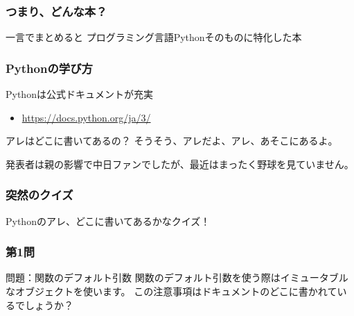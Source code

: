 \documentclass[aspectratio=169,dvipdfmx,12pt,notheorems]{beamer}
\theoremstyle{definition}
\begin{document}
\begin{frame}\frametitle{つまり、どんな本？}

\begin{block}{一言でまとめると}
プログラミング言語Pythonそのものに特化した本
\end{block}

\end{frame}

\begin{frame}\frametitle{Pythonの学び方}

\begin{block}{Pythonは公式ドキュメントが充実}
\begin{itemize}
\item \url{https://docs.python.org/ja/3/}
\end{itemize}
\end{block}

\begin{alertblock}{アレはどこに書いてあるの？}
そうそう、アレだよ、アレ、あそこにあるよ。
\end{alertblock}
発表者は親の影響で中日ファンでしたが、最近はまったく野球を見ていません。

\end{frame}

\begin{frame}\frametitle{突然のクイズ}

\begin{center}
\Huge{Pythonのアレ、どこに書いてあるかなクイズ！}
\end{center}

\end{frame}

\begin{frame}\frametitle{第1問}

\begin{block}{問題：関数のデフォルト引数}
関数のデフォルト引数を使う際はイミュータブルなオブジェクトを使います。
この注意事項はドキュメントのどこに書かれているでしょうか？
\end{block}


\end{frame}
\end{document}
